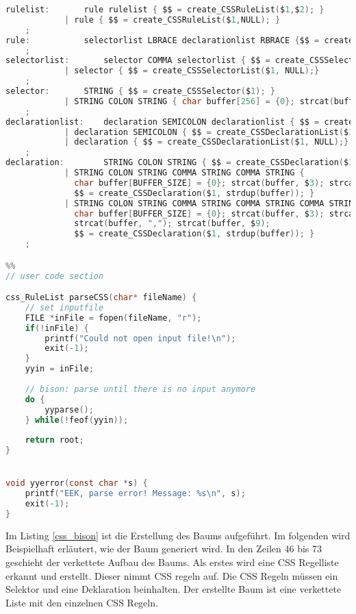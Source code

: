 \begin{lstlisting}[label=css_bison,language=C, caption=Baumgenerierung mit Bison]
rulelist:		rule rulelist { $$ = create_CSSRuleList($1,$2); }
			| rule { $$ = create_CSSRuleList($1,NULL); }
	;
rule:			selectorlist LBRACE declarationlist RBRACE {$$ = create_CSSRule($1, $3); }
	;
selectorlist:		selector COMMA selectorlist { $$ = create_CSSSelectorList($1,$3);}
			| selector { $$ = create_CSSSelectorList($1, NULL);}
	;			
selector:		STRING { $$ = create_CSSSelector($1); }
			| STRING COLON STRING { char buffer[256] = {0}; strcat(buffer, $1); strcat(buffer, ":"); strcat(buffer, $3);  $$ = create_CSSSelector(strdup(buffer)); }
	;
declarationlist: 	declaration SEMICOLON declarationlist { $$ = create_CSSDeclarationList($1,$3);}
			| declaration SEMICOLON { $$ = create_CSSDeclarationList($1, NULL);}
			| declaration { $$ = create_CSSDeclarationList($1, NULL);}
	;				
declaration:		STRING COLON STRING { $$ = create_CSSDeclaration($1, $3); }
			| STRING COLON STRING COMMA STRING COMMA STRING { 
			  char buffer[BUFFER_SIZE] = {0}; strcat(buffer, $3); strcat(buffer, ","); strcat(buffer, $5); strcat(buffer, ","); strcat(buffer, $7);
			  $$ = create_CSSDeclaration($1, strdup(buffer)); }
			| STRING COLON STRING COMMA STRING COMMA STRING COMMA STRING { 
			  char buffer[BUFFER_SIZE] = {0}; strcat(buffer, $3); strcat(buffer, ","); strcat(buffer, $5); strcat(buffer, ","); strcat(buffer, $7);
			  strcat(buffer, ","); strcat(buffer, $9); 
			  $$ = create_CSSDeclaration($1, strdup(buffer)); }
	;

%%
// user code section

css_RuleList parseCSS(char* fileName) {
    // set inputfile
    FILE *inFile = fopen(fileName, "r");
    if(!inFile) {
        printf("Could not open input file!\n");
        exit(-1);
    }
    yyin = inFile;
    
    // bison: parse until there is no input anymore
    do {
        yyparse();
    } while(!feof(yyin));
   	
    return root;
}


void yyerror(const char *s) {
    printf("EEK, parse error! Message: %s\n", s);
    exit(-1);
}
\end{lstlisting}

Im Listing \ref{css_bison} ist die Erstellung des Baums aufgeführt. Im folgenden wird Beispielhaft erläutert, wie der Baum generiert wird. In den Zeilen 46 bis 73 geschieht der verkettete Aufbau des Baums. Als erstes wird eine CSS Regelliste erkannt und erstellt. Dieser nimmt CSS regeln auf. Die CSS Regeln müssen ein Selektor und eine Deklaration beinhalten. Der erstellte Baum ist eine verkettete Liste mit den einzelnen CSS Regeln.
